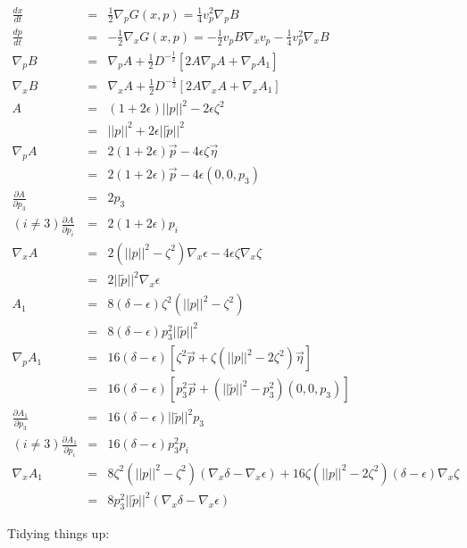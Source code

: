 \documentclass[12pt]{article}
\begin{document}
\begin{eqnarray}
\frac{dx}{dt}   &=&  \frac{1}{2}\nabla_p G(x,p) =  \frac{1}{4}v_p^2\nabla_pB\\
\frac{dp}{dt}   &=& -\frac{1}{2}\nabla_x G(x,p) = -\frac{1}{2}v_pB\nabla_xv_p-\frac{1}{4}v_p^2\nabla_xB\\
\nabla_p B      &=&  \nabla_p A+\frac{1}{2}D^{-\frac{1}{2}}\left[2A\nabla_p A + \nabla_p A_1\right]\\
\nabla_x B      &=&  \nabla_x A+\frac{1}{2}D^{-\frac{1}{2}}\left[2A\nabla_x A + \nabla_x A_1\right]\\
A               &=&  (1+2\epsilon)||p||^2-2\epsilon\zeta^2 \\
                &=&  ||p||^2+2\epsilon||\tilde{p}||^2 \\
\nabla_p A      &=&  2(1+2\epsilon)\vec{p}-4\epsilon\zeta\vec{\eta}\\
                &=&  2(1+2\epsilon)\vec{p}-4\epsilon(0,0,p_3)\\
\frac{\partial A}{\partial p_3} &=& 2p_3\\
(i\neq3)\frac{\partial A}{\partial p_i} &=& 2(1+2\epsilon)p_i\\
\nabla_x A      &=&  2(||p||^2-\zeta^2)\nabla_x \epsilon - 4\epsilon\zeta\nabla_x \zeta\\
                &=&  2||\tilde{p}||^2\nabla_x \epsilon\\
A_1             &=&  8(\delta-\epsilon)\zeta^2(||p||^2-\zeta^2) \\
                &=&  8(\delta-\epsilon)p_3^2||\tilde{p}||^2 \\
\nabla_p A_1    &=&  16(\delta-\epsilon)\left[\zeta^2\vec{p}+\zeta(||p||^2-2\zeta^2)\vec{\eta}\right]\\
                &=&  16(\delta-\epsilon)\left[p_3^2\vec{p}+(||\tilde{p}||^2-p_3^2)(0,0,p_3)\right]\\
\frac{\partial A_1}{\partial p_3} &=& 16(\delta-\epsilon)||\tilde{p}||^2p_3\\
(i\neq3)\frac{\partial A_1}{\partial p_i} &=& 16(\delta-\epsilon)p_3^2p_i\\
\nabla_x A_1    &=&  8\zeta^2(||p||^2-\zeta^2)(\nabla_x \delta - \nabla_x \epsilon) + 16\zeta(||p||^2-2\zeta^2)(\delta-\epsilon)\nabla_x \zeta \nonumber\\
                &=&  8p_3^2||\tilde{p}||^2(\nabla_x \delta - \nabla_x \epsilon) \nonumber
\end{eqnarray}

Tidying things up:
\end{document}
